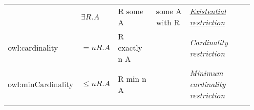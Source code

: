 \documentclass[a4paper,]{report}
\begin{document}
\begin{longtable}[]{@{}lllll@{}}
\begin{minipage}[t]{0.18\columnwidth}
\end{minipage} & \begin{minipage}[t]{0.16\columnwidth}\raggedright
\(\exists R.A\)\strut
\end{minipage} & \begin{minipage}[t]{0.17\columnwidth}\raggedright
R some A\strut
\end{minipage} & \begin{minipage}[t]{0.20\columnwidth}\raggedright
some A with R\strut
\end{minipage} & \begin{minipage}[t]{0.14\columnwidth}\raggedright
\href{https://en.wikipedia.org/wiki/Universal_quantifier}{\emph{Existential
restriction}}\strut
\end{minipage}\tabularnewline
\begin{minipage}[t]{0.18\columnwidth}\raggedright
owl:cardinality\strut
\end{minipage} & \begin{minipage}[t]{0.16\columnwidth}\raggedright
\(=n R.A\)\strut
\end{minipage} & \begin{minipage}[t]{0.17\columnwidth}\raggedright
R exactly n A\strut
\end{minipage} & \begin{minipage}[t]{0.20\columnwidth}\raggedright
\strut
\end{minipage} & \begin{minipage}[t]{0.14\columnwidth}\raggedright
\emph{Cardinality restriction}\strut
\end{minipage}\tabularnewline
\begin{minipage}[t]{0.18\columnwidth}\raggedright
owl:minCardinality\strut
\end{minipage} & \begin{minipage}[t]{0.16\columnwidth}\raggedright
\(\leq n R.A\)\strut
\end{minipage} & \begin{minipage}[t]{0.17\columnwidth}\raggedright
R min n A\strut
\end{minipage} & \begin{minipage}[t]{0.20\columnwidth}\raggedright
\strut
\end{minipage} & \begin{minipage}[t]{0.14\columnwidth}\raggedright
\emph{Minimum cardinality restriction}\strut
\end{minipage}\tabularnewline
\begin{minipage}[t]{0.18\columnwidth}\raggedright

\end{minipage}
\end{longtable}
\end{document}
